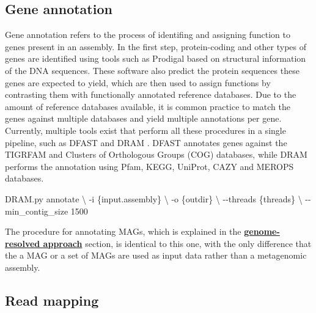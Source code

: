 \documentclass[
]{book}
\newenvironment{Shaded}{\begin{snugshade}}{\end{snugshade}}
\newcommand{\AttributeTok}[1]{\textcolor[rgb]{0.77,0.63,0.00}{#1}}
\newcommand{\DataTypeTok}[1]{\textcolor[rgb]{0.13,0.29,0.53}{#1}}
\newcommand{\ExtensionTok}[1]{#1}
\newcommand{\NormalTok}[1]{#1}
\begin{document}
\hypertarget{assembly-gene-annotation}{%
\subsection*{Gene annotation}\label{assembly-gene-annotation}}

Gene annotation refers to the process of identifing and assigning function to genes present in an assembly. In the first step, protein-coding and other types of genes are identified using tools such as Prodigal based on structural information of the DNA sequences. These software also predict the protein sequences these genes are expected to yield, which are then used to assign functions by contrasting them with functionally annotated reference databases. Due to the amount of reference databases available, it is common practice to match the genes against multiple databases and yield multiple annotations per gene. Currently, multiple tools exist that perform all these procedures in a single pipeline, such as DFAST \citep{Tanizawa2017-uy} and DRAM \citep{Shaffer2020-kp}. DFAST annotates genes against the TIGRFAM and Clusters of Orthologous Groups (COG) databases, while DRAM performs the annotation using Pfam, KEGG, UniProt, CAZY and MEROPS databases.

\begin{Shaded}
\begin{Highlighting}[]
\ExtensionTok{DRAM.py}\NormalTok{ annotate }\DataTypeTok{\textbackslash{}}
      \AttributeTok{{-}i}\NormalTok{ \{input.assembly\} }\DataTypeTok{\textbackslash{}}
      \AttributeTok{{-}o}\NormalTok{ \{outdir\} }\DataTypeTok{\textbackslash{}}
      \AttributeTok{{-}{-}threads}\NormalTok{ \{threads\} }\DataTypeTok{\textbackslash{}}
      \AttributeTok{{-}{-}min\_contig\_size}\NormalTok{ 1500}
\end{Highlighting}
\end{Shaded}

The procedure for annotating MAGs, which is explained in the \textbf{\protect\hyperlink{genome-resolved}{genome-resolved approach}} section, is identical to this one, with the only difference that the a MAG or a set of MAGs are used as input data rather than a metagenomic assembly.

\hypertarget{assembly-read-mapping}{%
\subsection*{Read mapping}\label{assembly-read-mapping}}
\end{document}
